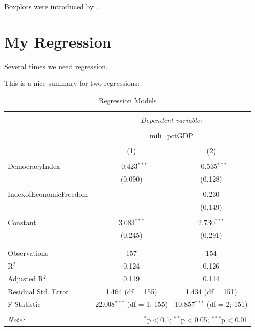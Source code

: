 \documentclass[11pt]{article}
\begin{document}
Boxplots were introduced by \citet{tukey_exploratory_1977}.


\section{My Regression}\label{regre}

Several times we need regression.



This is a nice summary for two regressions:

\begin{table}[!htbp] \centering 
  \caption{Regression Models} 
  \label{regs1} 
\begin{tabular}{@{\extracolsep{5pt}}lcc} 
\\[-1.8ex]\hline 
\hline \\[-1.8ex] 
 & \multicolumn{2}{c}{\textit{Dependent variable:}} \\ 
\cline{2-3} 
\\[-1.8ex] & \multicolumn{2}{c}{mili\_pctGDP} \\ 
\\[-1.8ex] & (1) & (2)\\ 
\hline \\[-1.8ex] 
 DemocracyIndex & $-$0.423$^{***}$ & $-$0.535$^{***}$ \\ 
  & (0.090) & (0.128) \\ 
  & & \\ 
 IndexofEconomicFreedom &  & 0.230 \\ 
  &  & (0.149) \\ 
  & & \\ 
 Constant & 3.083$^{***}$ & 2.730$^{***}$ \\ 
  & (0.245) & (0.291) \\ 
  & & \\ 
\hline \\[-1.8ex] 
Observations & 157 & 154 \\ 
R$^{2}$ & 0.124 & 0.126 \\ 
Adjusted R$^{2}$ & 0.119 & 0.114 \\ 
Residual Std. Error & 1.464 (df = 155) & 1.434 (df = 151) \\ 
F Statistic & 22.008$^{***}$ (df = 1; 155) & 10.857$^{***}$ (df = 2; 151) \\ 
\hline 
\hline \\[-1.8ex] 
\textit{Note:}  & \multicolumn{2}{r}{$^{*}$p$<$0.1; $^{**}$p$<$0.05; $^{***}$p$<$0.01} \\ 
\end{tabular} 
\end{table} 
\end{document}
